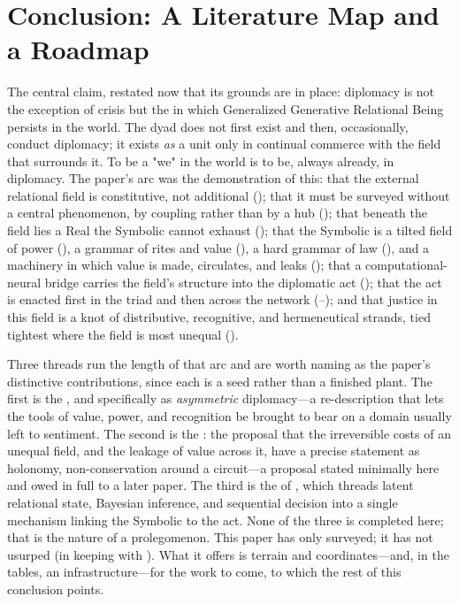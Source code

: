 \section{Conclusion: A Literature Map and a Roadmap}\label{p07:sec:roadmap}

The central claim, restated now that its grounds are in place: diplomacy is not the exception of crisis but the  in which Generalized Generative Relational Being persists in the world. The dyad does not first exist and then, occasionally, conduct diplomacy; it exists \emph{as} a unit only in continual commerce with the field that surrounds it. To be a "we" in the world is to be, always already, in diplomacy. The paper's arc was the demonstration of this: that the external relational field is constitutive, not additional (); that it must be surveyed without a central phenomenon, by coupling rather than by a hub (); that beneath the field lies a Real the Symbolic cannot exhaust (); that the Symbolic is a tilted field of power (), a grammar of rites and value (), a hard grammar of law (), and a machinery in which value is made, circulates, and leaks (); that a computational-neural bridge carries the field's structure into the diplomatic act (); that the act is enacted first in the triad and then across the network (--); and that justice in this field is a knot of distributive, recognitive, and hermeneutical strands, tied tightest where the field is most unequal ().

Three threads run the length of that arc and are worth naming as the paper's distinctive contributions, since each is a seed rather than a finished plant. The first is the , and specifically as \emph{asymmetric} diplomacy---a re-description that lets the tools of value, power, and recognition be brought to bear on a domain usually left to sentiment. The second is the : the proposal that the irreversible costs of an unequal field, and the leakage of value across it, have a precise statement as holonomy, non-conservation around a circuit---a proposal stated minimally here and owed in full to a later paper. The third is the  of , which threads latent relational state, Bayesian inference, and sequential decision into a single mechanism linking the Symbolic to the act. None of the three is completed here; that is the nature of a prolegomenon. This paper has only surveyed; it has not usurped (in keeping with ). What it offers is terrain and coordinates---and, in the tables, an infrastructure---for the work to come, to which the rest of this conclusion points.

